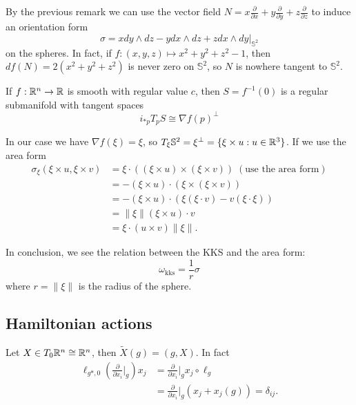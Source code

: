 \begin{itemize}
    By the previous remark we can use the vector field 
    $N= x\tfrac{\partial}{\partial x}+y\tfrac{\partial}{\partial y}+z\tfrac{\partial}{\partial z}$ to induce 
    an orientation form 
    \begin{equation}
        \sigma = xdy\wedge dz - ydx\wedge dz+zdx\wedge dy \big|_{\mathbb{S}^2}
    \end{equation}
    on the spheres. In fact, if $f:(x,y,z)\mapsto x^2+y^2+z^2-1$, then $df(N)=2(x^2+y^2+z^2)$ is never zero on $\mathbb{S}^2$, so 
    $N$ is nowhere tangent to $\mathbb{S}^2$.\par 

    \begin{dang}
        \begin{remark}
            If $f:\mathbb{R}^n\to\mathbb{R}$ is smooth with regular value $c$, then $S=f^{-1}(0)$ is a regular submanifold 
            with tangent spaces 
            \begin{equation}
                i_{*p}T_pS \cong \nabla f(p)^\perp
            \end{equation}
        \end{remark}
    \end{dang}

    In our case we have $\nabla f(\xi) = \xi$, so $T_\xi\mathbb{S}^2=\xi^\perp=\{\xi\times u:u\in\mathbb{R}^3\}$. If we 
    use the area form 
    \begin{equation}
        \begin{split}
            \sigma_\xi(\xi\times u,\xi\times v) &=\xi\cdot ((\xi\times u)\times (\xi\times v))\;(\text{use the area form})\\
            &=-(\xi\times u)\cdot (\xi\times(\xi\times v))\\
            &=-(\xi\times u)\cdot (\xi(\xi\cdot v)-v(\xi\cdot\xi))\\
            &=\|\xi\| (\xi\times u)\cdot v \\
            &=\xi\cdot (u\times v)\|\xi\|.
        \end{split}
    \end{equation}

    In conclusion, we see the relation between the KKS and the area form:
    \begin{equation}
        \omega_{\text{kks}}=\frac{1}{r}\sigma
    \end{equation}
    where $r=\|\xi\|$ is the radius of the sphere.
\end{itemize}

\subsection{Hamiltonian actions}
Let $X\in T_0\mathbb{R}^n\cong \mathbb{R}^n$, then $\widetilde{X}(g)=(g,X)$. In fact
\begin{equation}
    \begin{split}
         \ell_{g*,0}(\frac{\partial}{\partial x_i}\bigg|_g)x_j &= \frac{\partial}{\partial x_i}\bigg|_g x_j\circ \ell_g\\
         &=\frac{\partial}{\partial x_i}\bigg|_g(x_j+x_j(g))=\delta_{ij}.
    \end{split}
\end{equation}

